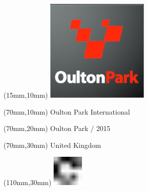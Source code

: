 \null\newpage
\begin{textblock*}{50mm}(15mm,10mm)%
\includegraphics[width=50mm]{LG/2015-05-20_00091.png}
\end{textblock*}
\begin{textblock*}{130mm}(70mm,10mm)%
{\fontsize{20}{20}\selectfont Oulton Park International}\\
\end{textblock*}
\begin{textblock*}{120mm}(70mm,20mm)%
{\fontsize{16}{16}\selectfont Oulton Park / 2015}\\
\end{textblock*}
\begin{textblock*}{120mm}(70mm,30mm)%
{\fontsize{12}{12}\selectfont United Kingdom}
\end{textblock*}
\begin{textblock*}{30mm}(110mm,30mm)%
\centering
\includegraphics[height=15mm]{icons/fa-rotate-right.pdf}
\end{textblock*}
